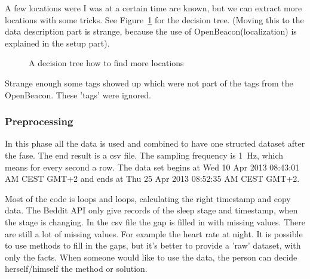 				
				A few locations were I was at a certain time are known, but we can extract more locations with some tricks. See Figure~\ref{fig:decisiontree} for the decision tree. (Moving this to the data description part is strange, because the use of OpenBeacon(localization) is explained in the setup part).

				\begin{figure}[h!]
					
					\caption{A decision tree how to find more locations}
					\label{fig:decisiontree}
				\end{figure}

				Strange enough some tags showed up which were not part of the tags from the OpenBeacon. These 'tags' were ignored.
				
		\subsubsection{Preprocessing}
			In this phase all the data is used and combined to have one structed dataset after the fase. The end result is a csv file. The sampling frequency is \SI{1}{\hertz}, which means for every second a row. The data set begins at Wed 10 Apr 2013 08:43:01 AM CEST GMT+2 and ends at Thu 25 Apr 2013 08:52:35 AM CEST GMT+2. 
			
			

			Most of the code is loops and loops, calculating the right timestamp and copy data. 
			The Beddit API only give records of the sleep stage and timestamp, when the stage is changing.
			In the csv file the gap is filled in with missing values. There are still a lot of missing values. For example the heart rate at night. It is possible to use methods to fill in the gaps, but it's better to provide a 'raw' dataset, with only the facts. When someone would like to use the data, the person can decide herself/himself the method or solution.



		
